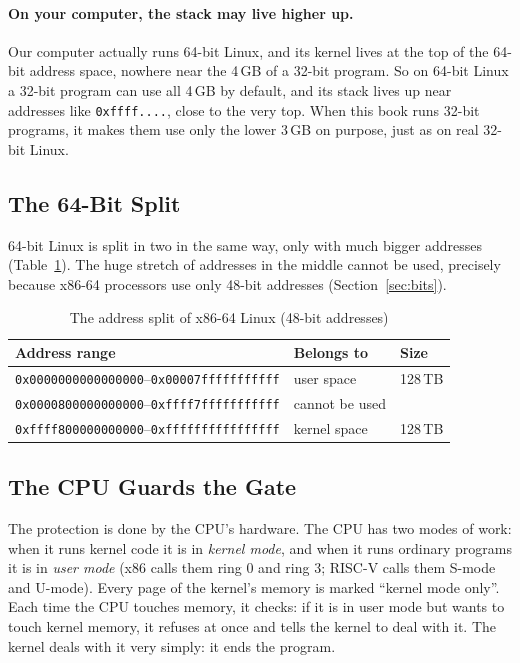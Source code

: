\paragraph{On your computer, the stack may live higher up.}
Our computer actually runs 64-bit Linux, and its kernel lives at the top of the 64-bit address space, nowhere near the 4\,GB of a 32-bit program. So on 64-bit Linux a 32-bit program can use all 4\,GB by default, and its stack lives up near addresses like \texttt{0xffff....}, close to the very top. When this book runs 32-bit programs, it makes them use only the lower 3\,GB on purpose, just as on real 32-bit Linux.

\subsection{The 64-Bit Split}

64-bit Linux is split in two in the same way, only with much bigger addresses (Table~\ref{tab:split}). The huge stretch of addresses in the middle cannot be used, precisely because x86-64 processors use only 48-bit addresses (Section~\ref{sec:bits}).

\begin{table}[htbp]
  \centering
  \caption{The address split of x86-64 Linux (48-bit addresses)}
  \label{tab:split}
  \small
  \begin{tabular}{lll}
    \toprule
    Address range & Belongs to & Size \\
    \midrule
    \texttt{0x0000000000000000}--\texttt{0x00007fffffffffff} & user space & 128\,TB \\
    \texttt{0x0000800000000000}--\texttt{0xffff7fffffffffff} & cannot be used & \\
    \texttt{0xffff800000000000}--\texttt{0xffffffffffffffff} & kernel space & 128\,TB \\
    \bottomrule
  \end{tabular}
\end{table}

\subsection{The CPU Guards the Gate}

The protection is done by the CPU's hardware. The CPU has two modes of work: when it runs kernel code it is in \emph{kernel mode}, and when it runs ordinary programs it is in \emph{user mode} (x86 calls them ring 0 and ring 3; RISC-V calls them S-mode and U-mode). Every page of the kernel's memory is marked ``kernel mode only''. Each time the CPU touches memory, it checks: if it is in user mode but wants to touch kernel memory, it refuses at once and tells the kernel to deal with it. The kernel deals with it very simply: it ends the program.

